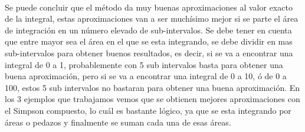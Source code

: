 \documentclass[report,oneside]{revcoles}
\begin{document}
~\\Se puede concluir que el método da muy buenas aproximaciones al valor exacto de la integral, estas aproximaciones van a ser muchísimo mejor si se parte el área de integración en un número elevado de sub-intervalos. Se debe tener en cuenta que entre mayor sea el área en el que se esta integrando, se debe dividir en mas sub-intervalos para obtener buenos resultados, es decir, si se va a encontrar una integral de 0 a 1, probablemente con 5 sub intervalos basta para obtener una buena aproximación, pero si se va a encontrar una integral de 0 a 10, ó de 0 a 100, estos 5 sub intervalos no bastaran para obtener una buena aproximación. En los 3 ejemplos que trabajamos vemos que se obtienen mejores aproximaciones con el Simpson compuesto, lo cuál es bastante lógico, ya que se esta integrando por áreas o pedazos y finalmente se suman cada una de esas áreas.


\nocite{A}
\nocite{B}
\nocite{C}
\nocite{D}
\nocite{E}
\nocite{F}
\nocite{G}
\nocite{H}

    \appendix%


\end{document}

